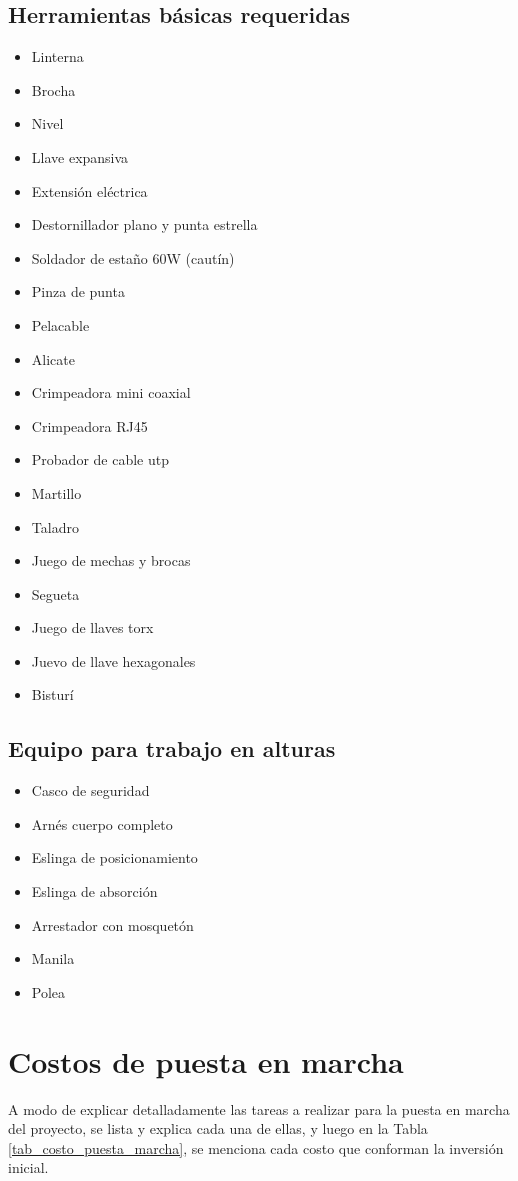 \documentclass[12pt,a4paper]{book}
\begin{document}
\subsection{Herramientas básicas requeridas}
\begin{itemize}
\item Linterna
\item Brocha
\item Nivel 
\item Llave expansiva
\item Extensión eléctrica
\item Destornillador plano y punta estrella
\item Soldador de estaño 60W (cautín)
\item Pinza de punta
\item Pelacable
\item Alicate
\item Crimpeadora mini coaxial
\item Crimpeadora RJ45
\item Probador de cable utp
\item Martillo
\item Taladro
\item Juego de mechas y brocas
\item Segueta
\item Juego de llaves torx
\item Juevo de llave hexagonales
\item Bisturí
\end{itemize}

\subsection{Equipo para trabajo en alturas}
\begin{itemize}
\item Casco de seguridad
\item Arnés cuerpo completo
\item Eslinga de posicionamiento
\item Eslinga de absorción
\item Arrestador con mosquetón
\item Manila
\item Polea
\end{itemize}


\section{Costos de puesta en marcha}
A modo de explicar detalladamente las tareas a realizar para la puesta en marcha del proyecto, se lista y explica cada una de ellas, y luego en la Tabla \ref{tab_costo_puesta_marcha}, se menciona cada costo que conforman la inversión inicial.
\end{document}
